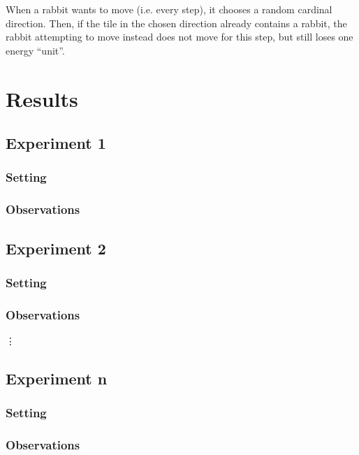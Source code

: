 \documentclass[11pt]{article}
\begin{document}
When a rabbit wants to move (i.e. every step), it chooses a random cardinal direction. Then, if the tile in the chosen direction already contains a rabbit, the rabbit attempting to move instead does not move for this step, but still loses one energy ``unit''.


\section{Results}

\subsection{Experiment 1}

\subsubsection{Setting}

\subsubsection{Observations}

\subsection{Experiment 2}

\subsubsection{Setting}

\subsubsection{Observations}

\vdots

\subsection{Experiment n}

\subsubsection{Setting}

\subsubsection{Observations}
\end{document}
